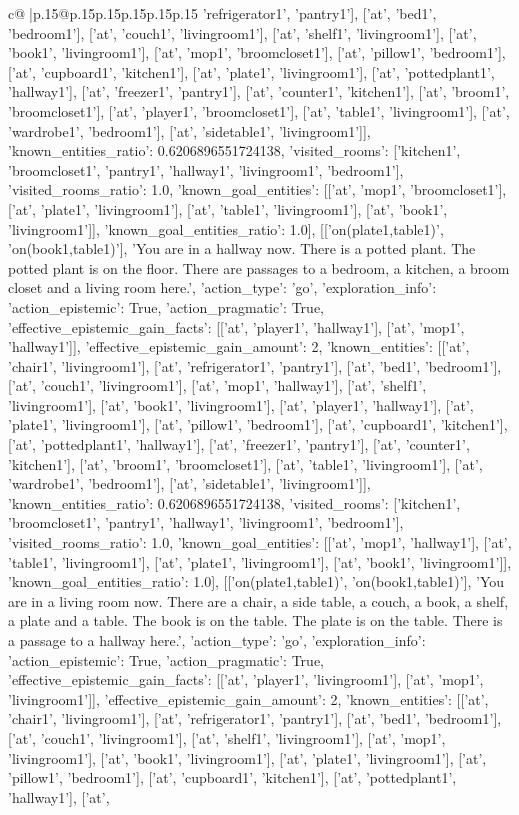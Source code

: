 \documentclass{article}
\begin{document}
{\begin{supertabular}{c@{$\;$}|p{.15\linewidth}@{}p{.15\linewidth}p{.15\linewidth}p{.15\linewidth}p{.15\linewidth}p{.15\linewidth}}
{{{'refrigerator1', 'pantry1'], ['at', 'bed1', 'bedroom1'], ['at', 'couch1', 'livingroom1'], ['at', 'shelf1', 'livingroom1'], ['at', 'book1', 'livingroom1'], ['at', 'mop1', 'broomcloset1'], ['at', 'pillow1', 'bedroom1'], ['at', 'cupboard1', 'kitchen1'], ['at', 'plate1', 'livingroom1'], ['at', 'pottedplant1', 'hallway1'], ['at', 'freezer1', 'pantry1'], ['at', 'counter1', 'kitchen1'], ['at', 'broom1', 'broomcloset1'], ['at', 'player1', 'broomcloset1'], ['at', 'table1', 'livingroom1'], ['at', 'wardrobe1', 'bedroom1'], ['at', 'sidetable1', 'livingroom1']], 'known_entities_ratio': 0.6206896551724138, 'visited_rooms': ['kitchen1', 'broomcloset1', 'pantry1', 'hallway1', 'livingroom1', 'bedroom1'], 'visited_rooms_ratio': 1.0, 'known_goal_entities': [['at', 'mop1', 'broomcloset1'], ['at', 'plate1', 'livingroom1'], ['at', 'table1', 'livingroom1'], ['at', 'book1', 'livingroom1']], 'known_goal_entities_ratio': 1.0}}], [['on(plate1,table1)', 'on(book1,table1)'], 'You are in a hallway now. There is a potted plant. The potted plant is on the floor. There are passages to a bedroom, a kitchen, a broom closet and a living room here.', {'action_type': 'go', 'exploration_info': {'action_epistemic': True, 'action_pragmatic': True, 'effective_epistemic_gain_facts': [['at', 'player1', 'hallway1'], ['at', 'mop1', 'hallway1']], 'effective_epistemic_gain_amount': 2, 'known_entities': [['at', 'chair1', 'livingroom1'], ['at', 'refrigerator1', 'pantry1'], ['at', 'bed1', 'bedroom1'], ['at', 'couch1', 'livingroom1'], ['at', 'mop1', 'hallway1'], ['at', 'shelf1', 'livingroom1'], ['at', 'book1', 'livingroom1'], ['at', 'player1', 'hallway1'], ['at', 'plate1', 'livingroom1'], ['at', 'pillow1', 'bedroom1'], ['at', 'cupboard1', 'kitchen1'], ['at', 'pottedplant1', 'hallway1'], ['at', 'freezer1', 'pantry1'], ['at', 'counter1', 'kitchen1'], ['at', 'broom1', 'broomcloset1'], ['at', 'table1', 'livingroom1'], ['at', 'wardrobe1', 'bedroom1'], ['at', 'sidetable1', 'livingroom1']], 'known_entities_ratio': 0.6206896551724138, 'visited_rooms': ['kitchen1', 'broomcloset1', 'pantry1', 'hallway1', 'livingroom1', 'bedroom1'], 'visited_rooms_ratio': 1.0, 'known_goal_entities': [['at', 'mop1', 'hallway1'], ['at', 'table1', 'livingroom1'], ['at', 'plate1', 'livingroom1'], ['at', 'book1', 'livingroom1']], 'known_goal_entities_ratio': 1.0}}], [['on(plate1,table1)', 'on(book1,table1)'], 'You are in a living room now. There are a chair, a side table, a couch, a book, a shelf, a plate and a table. The book is on the table. The plate is on the table. There is a passage to a hallway here.', {'action_type': 'go', 'exploration_info': {'action_epistemic': True, 'action_pragmatic': True, 'effective_epistemic_gain_facts': [['at', 'player1', 'livingroom1'], ['at', 'mop1', 'livingroom1']], 'effective_epistemic_gain_amount': 2, 'known_entities': [['at', 'chair1', 'livingroom1'], ['at', 'refrigerator1', 'pantry1'], ['at', 'bed1', 'bedroom1'], ['at', 'couch1', 'livingroom1'], ['at', 'shelf1', 'livingroom1'], ['at', 'mop1', 'livingroom1'], ['at', 'book1', 'livingroom1'], ['at', 'plate1', 'livingroom1'], ['at', 'pillow1', 'bedroom1'], ['at', 'cupboard1', 'kitchen1'], ['at', 'pottedplant1', 'hallway1'], ['at', }}}
\end{supertabular}}
\end{document}

